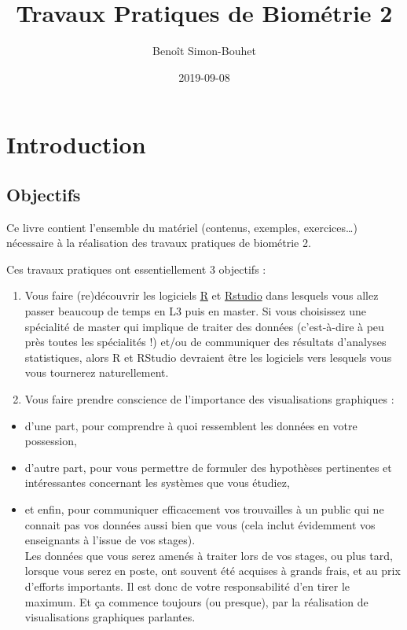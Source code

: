 \documentclass[a4paperpaper,]{article}
\title{Travaux Pratiques de Biométrie 2}
\author{Benoît Simon-Bouhet}
\date{2019-09-08}
\providecommand{\tightlist}{%
  \setlength{\itemsep}{0pt}\setlength{\parskip}{0pt}}
\begin{document}
\maketitle

{
\hypersetup{linkcolor=black}
\setcounter{tocdepth}{2}
\tableofcontents
}
\hypertarget{introduction}{%
\section{Introduction}\label{introduction}}

\hypertarget{objectifs}{%
\subsection{Objectifs}\label{objectifs}}

Ce livre contient l'ensemble du matériel (contenus, exemples, exercices\ldots{}) nécessaire à la réalisation des travaux pratiques de biométrie 2.

Ces travaux pratiques ont essentiellement 3 objectifs :

\begin{enumerate}
\def\labelenumi{\arabic{enumi}.}
\tightlist
\item
  Vous faire (re)découvrir les logiciels \href{https://cran.r-project.org}{R} et \href{https://www.rstudio.com}{Rstudio} dans lesquels vous allez passer beaucoup de temps en L3 puis en master. Si vous choisissez une spécialité de master qui implique de traiter des données (c'est-à-dire à peu près toutes les spécialités !) et/ou de communiquer des résultats d'analyses statistiques, alors R et RStudio devraient être les logiciels vers lesquels vous vous tournerez naturellement.
\item
  Vous faire prendre conscience de l'importance des visualisations graphiques :
\end{enumerate}

\begin{itemize}
\tightlist
\item
  d'une part, pour comprendre à quoi ressemblent les données en votre possession,
\item
  d'autre part, pour vous permettre de formuler des hypothèses pertinentes et intéressantes concernant les systèmes que vous étudiez,
\item
  et enfin, pour communiquer efficacement vos trouvailles à un public qui ne connait pas vos données aussi bien que vous (cela inclut évidemment vos enseignants à l'issue de vos stages).\\
  Les données que vous serez amenés à traiter lors de vos stages, ou plus tard, lorsque vous serez en poste, ont souvent été acquises à grands frais, et au prix d'efforts importants. Il est donc de votre responsabilité d'en tirer le maximum. Et ça commence toujours (ou presque), par la réalisation de visualisations graphiques parlantes.
\end{itemize}
\end{document}
